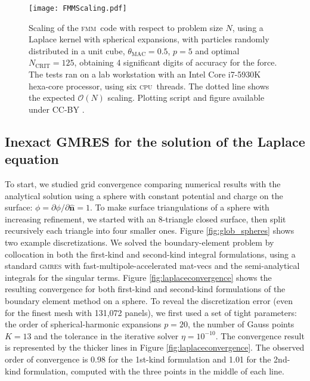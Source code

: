 \documentclass[smallcondensed,final]{svjour3}
\newcommand{\cpu}{\textsc{cpu}}
\newcommand{\fmm}{\textsc{fmm}\xspace}
\renewcommand{\O}[1]{\mathcal{O}(#1)}
\newcommand{\ncrit}{N_{\text{CRIT}}}
\newcommand{\gmres}{\textsc{gmres}\xspace}
\newcommand{\partialdi}[2]{\partial #1 / \partial #2}
\newcommand{\nhat}{\hat{\mathbf{n}}}
\begin{document}
\begin{figure}
\begin{center}
	\texttt{[image: FMMScaling.pdf]}
	\caption{Scaling of the \fmm\ code with respect to problem size $N$, using a Laplace kernel with spherical expansions, with particles randomly distributed in a unit cube, $\theta_{\text{MAC}} = 0.5$, $p=5$ and optimal $\ncrit = 125$, obtaining 4 significant digits of accuracy for the force. The tests ran on a lab workstation with an Intel Core i7-5930K hexa-core processor, using six \cpu\ threads. The dotted line shows the expected $\O{N}$ scaling. Plotting script and figure available under CC-BY \cite{WangLaytonBarba2016-figshare1}.}
	\label{fig:fmm_scaling}
\end{center}
\end{figure}

\subsection{Inexact {\small GMRES} for the solution of the Laplace equation}
\label{sec:inexactLaplace}
To start, we studied grid convergence comparing numerical results with the analytical solution using a sphere with constant potential and charge on the surface: $\phi = \partialdi{\phi}{\nhat} = 1$. To make surface triangulations of a sphere with increasing refinement, we started with an 8-triangle closed surface, then split recursively each triangle into four smaller ones. Figure \ref{fig:glob_spheres} shows two example discretizations. We solved the boundary-element problem by collocation in both the first-kind and second-kind integral formulations, using a standard \gmres with fast-multipole-accelerated mat-vecs and the semi-analytical integrals for the singular terms. Figure \ref{fig:laplaceconvergence} shows the resulting convergence for both first-kind and second-kind formulations of the boundary element method on a sphere. To reveal the discretization error (even for the finest mesh with 131,072 panels), we first used a set of tight parameters: the order of spherical-harmonic expansions $p=20$, the number of Gauss points $K=13$ and the tolerance in the iterative solver $\eta=10^{-10}$. The convergence result is represented by the thicker lines in Figure \ref{fig:laplaceconvergence}. The observed order of convergence is 0.98 for the 1st-kind formulation and 1.01 for the 2nd-kind formulation, computed with the three points in the middle of each line. 
\end{document}
